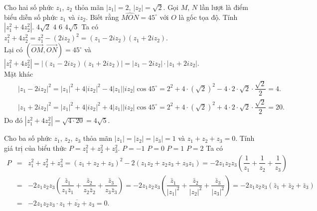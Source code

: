 \begin{bt}%
	Cho hai số phức $z_1$, $z_2$ thỏa mãn $|z_1|=2$, $|z_2|=\sqrt{2}$. Gọi $M$, $N$ lần lượt là điểm biểu diễn số phức $z_1$ và $iz_2$. Biết rằng $\widehat{MON}=45^\circ$ với $O$ là gốc tọa độ. Tính $\left|z_1^2 + 4z_2^2\right|$.
	\choice
	{$4\sqrt{2}$}
	{$4$}
	{$6$}
	{\True $4\sqrt{5}$}
	\loigiai
	{
		Ta có $z_1^2+4z_2^2 = z_1^2 - (2iz_2)^2 = (z_1-2iz_2)(z_1+2iz_2)$.\\
		Lại có $\left(\overrightarrow{OM}, \overrightarrow{ON}\right)=45^\circ$ và $|z_1^2+4z_2^2|=|(z_1-2iz_2)(z_1+2iz_2)| = |z_1-2iz_2| \cdot |z_1+2iz_2|$.\\
		Mặt khác
		\allowdisplaybreaks
		\begin{eqnarray*}
			&& |z_1-2iz_2|^2 = |z_1|^2 + 4|iz_2|^2 - 4|z_1||iz_2|\cos 45^\circ = 2^2+4\cdot (\sqrt{2})^2 - 4\cdot 2 \cdot \sqrt{2} \cdot \dfrac{\sqrt{2}}{2} = 4.\\
			&& |z_1+2iz_2|^2 = |z_1|^2 + 4|iz_2|^2 + 4|z_1||iz_2|\cos 45^\circ = 2^2+4\cdot (\sqrt{2})^2 + 4\cdot 2 \cdot \sqrt{2} \cdot \dfrac{\sqrt{2}}{2} = 20.
		\end{eqnarray*}
		Do đó $\left|z_1^2 + 4z_2^2\right| = \sqrt{4 \cdot 20}= 4\sqrt{5}$.
	}
\end{bt}

\begin{bt}%
	Cho ba số phức $z_1$, $z_2$, $z_3$ thỏa mãn $|z_1|=|z_2|=|z_3|=1$ và $z_1+z_2+z_3=0$. Tính giá trị của biểu thức $P=z_1^2 + z_2^2 + z_3^2$.
	\choice
	{$P=-1$}
	{\True $P=0$}
	{$P=1$}
	{$P=2$}
	\loigiai
	{
		Ta có
		\allowdisplaybreaks
		\begin{eqnarray*}
			P &=& z_1^2 + z_2^2 +z_3^2 = (z_1+z_2+z_3)^2-2(z_1z_2+z_2z_3+z_3z_1) = -2z_1z_2z_3\left(\dfrac{1}{z_1} + \dfrac{1}{z_2} + \dfrac{1}{z_3}\right) \\
			&=& -2z_1z_2z_3\left(\dfrac{\bar{z}_1}{z_1\bar{z}_1} + \dfrac{\bar{z}_2}{z_2\bar{z}_2} + \dfrac{\bar{z}_3}{z_3\bar{z}_3}\right) = -2z_1z_2z_3\left(\dfrac{\bar{z}_1}{|z_1|^2} + \dfrac{\bar{z}_2}{|z_2|^2} + \dfrac{\bar{z}_3}{|z_3|^2}\right) = -2z_1z_2z_3\left(\bar{z}_1 + \bar{z}_2 + \bar{z}_3\right)\\
			&=& -2z_1z_2z_3 \cdot \overline{z_1+z_2+z_3} = 0.
		\end{eqnarray*}
	}
\end{bt}


